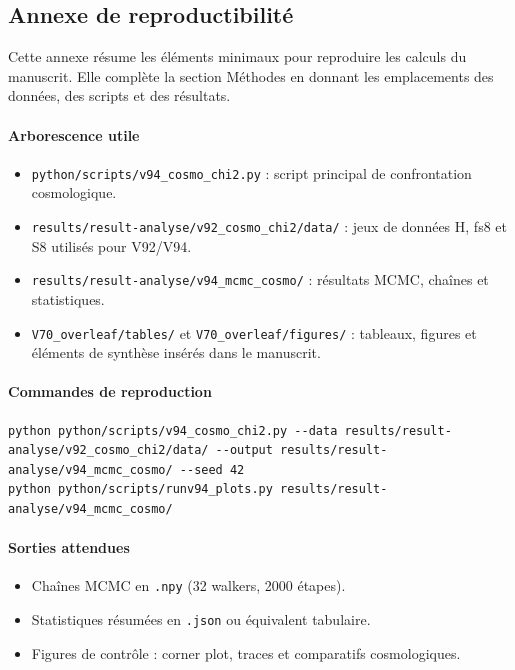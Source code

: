 \documentclass[11pt,a4paper]{article}
\begin{document}
\subsection{Annexe de reproductibilité}
\label{sec:reproductibilite}
Cette annexe résume les éléments minimaux pour reproduire les calculs du manuscrit. Elle complète la section Méthodes en donnant les emplacements des données, des scripts et des résultats.

\paragraph{Arborescence utile}
\begin{itemize}
\item \texttt{python/scripts/v94\_cosmo\_chi2.py} : script principal de confrontation cosmologique.
\item \texttt{results/result-analyse/v92\_cosmo\_chi2/data/} : jeux de données H, fs8 et S8 utilisés pour V92/V94.
\item \texttt{results/result-analyse/v94\_mcmc\_cosmo/} : résultats MCMC, chaînes et statistiques.
\item \texttt{V70\_overleaf/tables/} et \texttt{V70\_overleaf/figures/} : tableaux, figures et éléments de synthèse insérés dans le manuscrit.
\end{itemize}

\paragraph{Commandes de reproduction}
\begin{verbatim}
python python/scripts/v94_cosmo_chi2.py --data results/result-analyse/v92_cosmo_chi2/data/ --output results/result-analyse/v94_mcmc_cosmo/ --seed 42
python python/scripts/runv94_plots.py results/result-analyse/v94_mcmc_cosmo/
\end{verbatim}

\paragraph{Sorties attendues}
\begin{itemize}
\item Chaînes MCMC en \texttt{.npy} (32 walkers, 2000 étapes).
\item Statistiques résumées en \texttt{.json} ou équivalent tabulaire.
\item Figures de contrôle : corner plot, traces et comparatifs cosmologiques.
\end{itemize}
\end{document}
